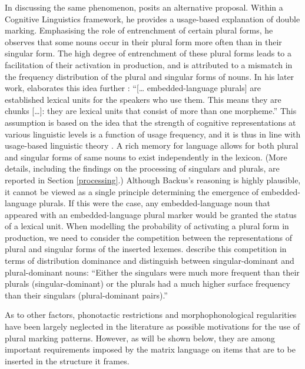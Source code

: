 In discussing the same phenomenon, \cite[151]{backus-two-1996} posits an alternative proposal. Within a Cognitive Linguistics framework, he provides a usage-based explanation of double marking. Emphasising the role of entrenchment of certain plural forms, he observes that some nouns occur in their plural form more often than in their singular form. The high degree of entrenchment of these plural forms leads to a facilitation of their activation in production, and is attributed to a mismatch in the frequency distribution of the plural and singular forms of nouns. In his later work, \cite[98]{backus-evidence-1999} elaborates this idea further : ``[\dots{} embedded-language plurals] are established lexical units for the speakers who use them. This means they are chunks [\dots{}]: they are lexical units that consist of more than one morpheme.'' This assumption is based on the idea that the strength of cognitive representations at various linguistic levels is a function of usage frequency, and it is thus in line with usage-based linguistic theory \citep{bybee-morphology-1985,bybee-repetition-2006,bybee-book-2010}. A rich memory for language \citep{langacker-foundations-1987,langacker00,tomasello-constructing-2003,bybee-book-2010} allows for both plural and singular forms of same nouns to exist independently in the lexicon. (More details, including the findings on the processing of singulars and plurals, are reported in Section \ref{processing}.) Although Backus's reasoning is highly  plausible, it cannot be viewed as a single principle determining the emergence of embedded-language plurals. If this were the case, any embedded-language noun that appeared with an embedded-language plural marker would be granted the status of a lexical unit. When modelling the probability of activating a plural form in production, we need to consider the competition between the representations of plural and singular forms of the inserted lexemes. \cite[][97]{baayen-dijkstra-schreuder} describe this competition in terms of distribution dominance and distinguish between singular-dominant and plural-dominant nouns: “Either the singulars were much more frequent than their plurals (singular-dominant) or the plurals had a much higher surface frequency than their singulars (plural-dominant pairs).”

As to other factors, phonotactic restrictions and morphophonological regularities have been largely neglected in the literature as possible motivations for the use of  plural marking patterns. However, as will be shown below, they are among important requirements imposed by the matrix language on items that are to be inserted in the structure it frames.

